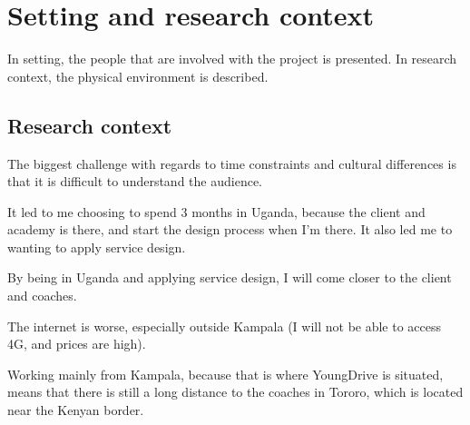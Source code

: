 \section{Setting and research context}

In setting, the people that are involved with the project is presented. In research context, the physical environment is described.



\subsection{Research context}

The biggest challenge with regards to time constraints and cultural differences is that it is difficult to understand the audience.

It led to me choosing to spend 3 months in Uganda, because the client and academy is there, and start the design process when I'm there. It also led me to wanting to apply service design.

By being in Uganda and applying service design, I will come closer to the client and coaches.

The internet is worse, especially outside Kampala (I will not be able to access 4G, and prices are high).

Working mainly from Kampala, because that is where YoungDrive is situated, means that there is still a long distance to the coaches in Tororo, which is located near the Kenyan border.
